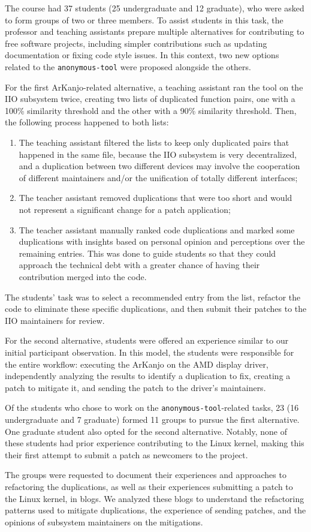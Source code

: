 The course had 37 students (25 undergraduate and 12 graduate), who were asked to form groups of
two or three members. To assist students in this task, the professor and teaching assistants prepare multiple
alternatives for contributing to free software projects, including simpler contributions such as
updating documentation or fixing code style issues. In this context, two new options related to the
\texttt{anonymous-tool} were proposed alongside the others.

For the first ArKanjo-related alternative, a teaching assistant ran the tool on the IIO subsystem twice, 
creating two lists of duplicated function pairs, one with a 100\% similarity threshold and the other 
with a 90\% similarity threshold. Then, the following process happened to both lists:

\begin{enumerate}
    \item The teaching assistant filtered the lists to keep only duplicated pairs that happened in the same file, because the IIO subsystem is very decentralized, and a duplication between two different devices may involve the cooperation of different maintainers and/or the unification of totally different interfaces;
    \item The teacher assistant removed duplications that were too short and would not represent a significant change for a patch application;
    \item The teacher assistant manually ranked code duplications and marked some duplications with insights based on personal opinion and perceptions over the remaining entries. This was done to guide students so that they could approach the technical debt with a greater chance of having their contribution merged into the code.
\end{enumerate}

The students' task was to select a recommended entry from the list, refactor the code to eliminate 
these specific duplications, and then submit their patches to the IIO maintainers for review.

For the second alternative, students were offered an experience similar to our initial participant
observation. In this model, the students were responsible for the entire workflow: executing the
ArKanjo on the AMD display driver, independently analyzing the results to identify a duplication
to fix, creating a patch to mitigate it, and sending the patch to the driver's maintainers.

Of the students who chose to work on the \texttt{anonymous-tool}-related tasks, 
23 (16 undergraduate and 7 graduate)
formed 11 groups to pursue the first alternative. One graduate student also opted for the second 
alternative. Notably, none of these students had prior experience contributing to the Linux kernel, 
making this their first attempt to submit a patch as newcomers to the project.

The groups were requested to document their experiences and approaches to refactoring the duplications,
as well as their experiences submitting a patch to the Linux kernel, in blogs. We analyzed these 
blogs to understand the refactoring patterns used to mitigate duplications, the experience of 
sending patches, and the opinions of subsystem maintainers on the mitigations.
